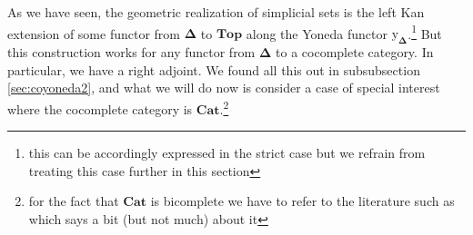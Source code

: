 \\\\
As we have seen, the geometric realization of simplicial sets is the left Kan extension of some functor from $\mathbf{\Delta}$ to $\mathbf{Top}$ along the Yoneda functor $\mathrm{y}_{\mathbf{\Delta}}$.\footnote{this can be accordingly expressed in the strict case but we refrain from treating this case further in this section} But this construction works for any functor from $\mathbf{\Delta}$ to a cocomplete category.
In particular, we have a right adjoint.
We found all this out in subsubsection \ref{sec:coyoneda2}, and what we will do now is consider a case of special interest where the cocomplete category is $\mathbf{Cat}$.\footnote{for the fact that $\mathbf{Cat}$ is bicomplete we have to refer to the literature such as \cite{52fbba46} which says a bit (but not much) about it}
\\
